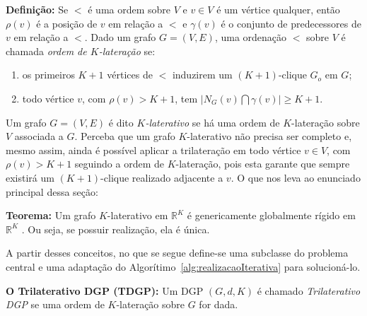 \begin{center}
	\begin{minipage}{0.93 \linewidth}
		\textbf{Definição:} Se $<$ é uma ordem sobre $V$ e $v\in V$ é um vértice qualquer, então $\rho(v)$ é a posição de $v$ em relação a $<$ e $\gamma(v)$ é o conjunto de predecessores de $v$ em relação a $<$. Dado um grafo $G=(V,E)$, uma ordenação $<$ sobre $V$ é chamada \textit{ordem de $K$-lateração} se:
		\begin{enumerate}
			\vspace{-0.2cm}
			\item os primeiros $K+1$ vértices de $<$ induzirem um $(K+1)$-clique $G_o$ em $G$;
			\vspace{-0.2cm}
			\item todo vértice $v$, com $\rho(v) > K+1$, tem $\lvert N_G(v) \bigcap \gamma(v)\rvert \geq K+1$.
		\end{enumerate}
	\end{minipage}
\end{center}

Um grafo $G = (V,E)$ é dito \textit{$K$-laterativo} se há uma ordem de $K$-lateração sobre $V$ associada a $G$. Perceba que um grafo $K$-laterativo não precisa ser completo e, mesmo assim, ainda é possível aplicar a trilateração em todo vértice $v \in V$, com $\rho(v) >K+1$ seguindo a ordem de $K$-lateração, pois esta garante que sempre existirá um $(K+1)$-clique realizado adjacente a $v$. O que nos leva ao enunciado principal dessa seção:

\begin{center}
	\begin{minipage}{0.93 \linewidth}
		\textbf{Teorema:} Um grafo $K$-laterativo em $\mathbb{R}^K$ é genericamente globalmente rígido em $\mathbb{R}^K$ \cite{eren2004rigidity,carlileGDandAplications}. Ou seja, se possuir realização, ela é única.
	\end{minipage}
\end{center}

A partir desses conceitos, no que se segue define-se uma subclasse do problema central e uma adaptação do Algorítimo~\ref{alg:realizacaoIterativa} para solucioná-lo.
\begin{center}
	\begin{minipage}{0.93 \linewidth}
		\textbf{O Trilaterativo DGP (TDGP):} Um DGP $(G,d,K)$ é chamado \textit{Trilaterativo DGP} se uma ordem de $K$-lateração sobre $G$ for dada.
	\end{minipage}
\end{center}

